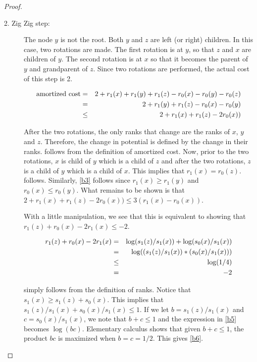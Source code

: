 {\begin{proof}
\begin{description}
\item[2. Zig Zig step:] The node $y$ is not the root. Both $y$ and $z$
are left (or right) children. In this case, two rotations are
made. The first rotation is at $y$, so that $z$ and $x$ are children
of $y$. The second rotation is at $x$ so that it becomes the parent of
$y$ and grandparent of $z$. Since two rotations are performed, the
actual cost of this step is 2.

\begin{eqnarray}
\mbox{amortized cost} & =  & 2 + r_1(x) + r_1(y) + r_1(z) - r_0(x) -r_0(y) - r_0(z) \eqlabel{b1}\\
                      & =  & 2 + r_1(y) + r_1(z) - r_0(x) - r_0(y) 
	\eqlabel{b2}\\
                      &\leq& 2 + r_1(x) + r_1(z) - 2r_0(x)) \eqlabel{b3}\\
\end{eqnarray}

After the two rotations, the only ranks that change are the ranks of
$x$, $y$ and $z$. Therefore, the change in potential is defined by the
change in their ranks.  follows from the definition of
amortized cost. Now, prior to the two rotations, $x$ is child of $y$
which is a child of $z$ and after the two rotations, $z$ is a child of
$y$ which is a child of $x$. This implies that $r_1(x) =
r_0(z)$.  follows. Similarly, \eqref{b3} follows
since $r_1(x) \geq r_1(y)$ and $r_0(x) \leq r_0(y)$. What remains to
be shown is that $2 + r_1(x) + r_1(z) - 2r_0(x)) \leq 3(r_1(x) -
r_0(x))$.

With a little manipulation, we see that this is equivalent to showing
that $r_1(z) + r_0(x) - 2r_1(x) \leq -2$.

\begin{eqnarray}
r_1(z) + r_0(x) - 2r_1(x) & = & \log(s_1(z)/s_1(x)) + \log(s_0(x)/s_1(x))
	\eqlabel{b4}\\
                       & = & \log((s_1(z)/s_1(x))*(s_0(x)/s_1(x))) 
	\eqlabel{b5}\\ 
                       &\leq& \log(1/4)
	\eqlabel{b6}\\
                       & = & -2
\end{eqnarray}

 simply follows from the definition of ranks. Notice that
$s_1(x) \geq s_1(z) + s_0(x)$. This implies that $s_1(z)/s_1(x) +
s_0(x)/s_1(x) \leq 1$. If we let $b= s_1(z)/s_1(x)$ and
$c=s_0(x)/s_1(x)$, we note that $b+c\leq 1$ and the expression in
\eqref{b5} becomes $\log(bc)$. Elementary calculus shows that given
$b+c \leq 1$, the product $bc$ is maximized when $b=c=1/2$. This gives
\eqref{b6}.


\end{description}
\end{proof}}
